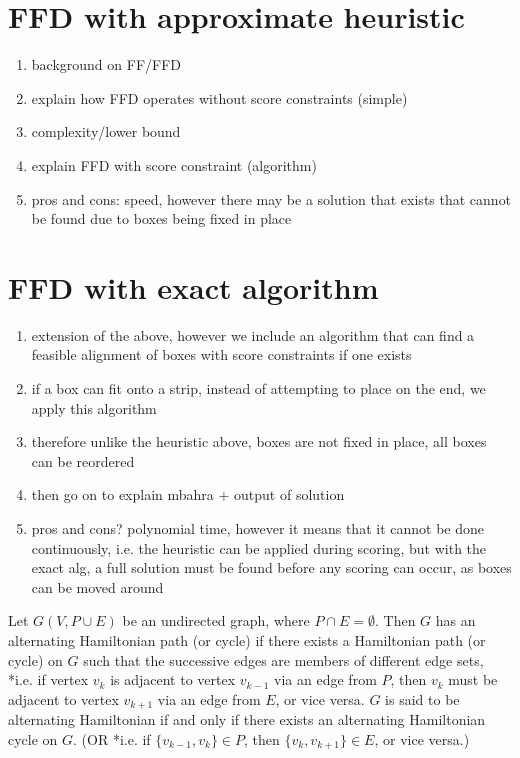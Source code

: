 \documentclass{llncs}
\begin{document}
\section{FFD with approximate heuristic}
\begin{enumerate}
	\item background on FF/FFD
	\item explain how FFD operates without score constraints (simple)
	\item complexity/lower bound
	\item explain FFD with score constraint (algorithm)
	\item pros and cons: speed, however there may be a solution that exists that cannot be found due to boxes being fixed in place
\end{enumerate}

\section{FFD with exact algorithm}
\begin{enumerate}
	\item extension of the above, however we include an algorithm that can find a feasible alignment of boxes with score constraints if one exists
	\item if a box can fit onto a strip, instead of attempting to place on the end, we apply this algorithm
	\item therefore unlike the heuristic above, boxes are not fixed in place, all boxes can be reordered
	\item then go on to explain mbahra + output of solution
	\item pros and cons? polynomial time, however it means that it cannot be done continuously, i.e. the heuristic can be applied during scoring, but with the exact alg, a full solution must be found before any scoring can occur, as boxes can be moved around
\end{enumerate}

\begin{definition}
	Let $G(V,P\cup E)$ be an undirected graph, where $P \cap E = \emptyset$. Then $G$ has an alternating Hamiltonian path (or cycle) if there exists a Hamiltonian path (or cycle) on $G$ such that the successive edges are members of different edge sets, *i.e. if vertex $v_k$ is adjacent to vertex $v_{k-1}$ via an edge from $P$, then $v_k$ must be adjacent to vertex $v_{k+1}$ via an edge from $E$, or vice versa. $G$ is said to be alternating Hamiltonian if and only if there exists an alternating Hamiltonian cycle on $G$. (OR *i.e. if $\{v_{k-1}, v_k\} \in P$, then $\{v_k, v_{k+1}\} \in E$, or vice versa.)
\end{definition}
\end{document}
